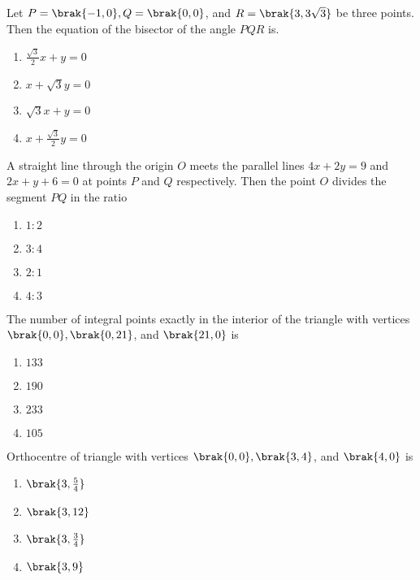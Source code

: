 \item{ Let $P=\brak{-1,0},Q=\brak{0,0}$, and $R=\brak{3,3\sqrt{3}}$ be three points. Then the equation of the bisector of the angle $PQR$ is. \hfill{}
\begin{enumerate}[label=(\alph*)]
    \item $\frac{\sqrt{3}}{2}x+y=0$
    \item $x+\sqrt{3}y=0$
    \item $\sqrt{3}x+y=0$
    \item $x+\frac{\sqrt{3}}{2}y=0$
\end{enumerate}}
\item{ A straight line through the origin $O$ meets the parallel lines $4x+2y=9$ and $2x+y+6=0$ at points $P$ and $Q$ respectively. Then the point $O$ divides the segment $PQ$ in the ratio \hfill{}
\begin{enumerate}[label=(\alph*)] 
    \item $1\colon2$
    \item $3\colon4$
    \item $2\colon1$
    \item $4\colon3$
\end{enumerate}}
\item{ The number of integral points  exactly in the interior of the triangle with vertices $\brak{0,0},\brak{0,21}$, and $\brak{21,0}$ is \hfill{}
\begin{enumerate}[label=(\alph*)]
    \item $133$
    \item $190$
    \item $233$
    \item $105$
\end{enumerate}}
\item{ Orthocentre of triangle with vertices $\brak{0,0},\brak{3,4}$, and $\brak{4,0}$ is \hfill{}
\begin{enumerate}[label=(\alph*)]
    \item $\brak{3,\frac{5}{4}}$
    \item $\brak{3,12}$
    \item $\brak{3,\frac{3}{4}}$
    \item $\brak{3,9}$
\end{enumerate}}
